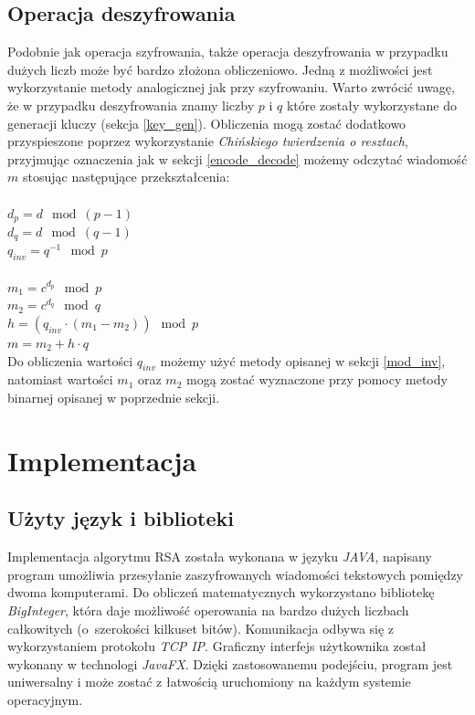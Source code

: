 \documentclass[10pt,a4paper]{article}
\begin{document}
\subsection{Operacja deszyfrowania}

Podobnie jak operacja szyfrowania, także operacja deszyfrowania w przypadku dużych liczb może być bardzo złożona obliczeniowo. Jedną z możliwości jest wykorzystanie metody analogicznej jak przy szyfrowaniu. Warto zwrócić uwagę, że w przypadku deszyfrowania znamy liczby $p$ i $q$ które zostały wykorzystane do generacji kluczy (sekcja \ref{key_gen}). Obliczenia mogą zostać dodatkowo przyspieszone poprzez wykorzystanie \textit{Chińskiego twierdzenia o resztach}, przyjmując oznaczenia jak w sekcji \ref{encode_decode} możemy odczytać wiadomość $m$ stosując następujące przekształcenia:\\
\\
$d_p = d \mod (p-1)$\\ 
$d_q = d \mod (q-1)$\\
$q_{inv} = q^{-1} \mod p$\\ \\ 
$m_1 = c^{d_p} \mod p$\\
$m_2 = c^{d_q} \mod q$\\
$h = (q_{inv} \cdot (m_1 - m_2)) \mod p$\\
$m = m_2 + h \cdot q$\\

Do obliczenia wartości $q_{inv}$ możemy użyć metody opisanej w sekcji \ref{mod_inv}, natomiast wartości $m_1$ oraz $m_2$ mogą zostać wyznaczone przy pomocy metody binarnej opisanej w poprzednie sekcji.


\section{Implementacja}
\subsection{Użyty język i biblioteki}

Implementacja algorytmu RSA została wykonana w języku \textit{JAVA}, napisany program umożliwia przesyłanie zaszyfrowanych wiadomości tekstowych pomiędzy dwoma komputerami. Do obliczeń matematycznych wykorzystano bibliotekę \textit{BigInteger}, która daje możliwość operowania na bardzo dużych liczbach całkowitych (o~szerokości kilkuset bitów). Komunikacja odbywa się z wykorzystaniem protokołu \textit{TCP IP}. Graficzny interfejs użytkownika został wykonany w technologi \textit{JavaFX}. Dzięki zastosowanemu podejściu, program jest uniwersalny i może zostać z łatwością uruchomiony na każdym systemie operacyjnym. 
\end{document}

